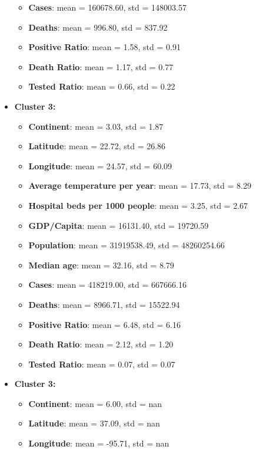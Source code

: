 \documentclass[12pt,a4paper]{article}
\begin{document}
\begin{itemize}
\begin{itemize}
            \item \textbf{Cases}: mean = 160678.60, std = 148003.57
            \item \textbf{Deaths}: mean = 996.80, std = 837.92
            \item \textbf{Positive Ratio}: mean = 1.58, std = 0.91
            \item \textbf{Death Ratio}: mean = 1.17, std = 0.77
            \item \textbf{Tested Ratio}: mean = 0.66, std = 0.22
        \end{itemize}
    \item \textbf{Cluster 3:} 
        \begin{itemize}
            \item \textbf{Continent}: mean = 3.03, std = 1.87
            \item \textbf{Latitude}: mean = 22.72, std = 26.86
            \item \textbf{Longitude}: mean = 24.57, std = 60.09
            \item \textbf{Average temperature per year}: mean = 17.73, std = 8.29
            \item \textbf{Hospital beds per 1000 people}: mean = 3.25, std = 2.67
            \item \textbf{GDP/Capita}: mean = 16131.40, std = 19720.59
            \item \textbf{Population}: mean = 31919538.49, std = 48260254.66
            \item \textbf{Median age}: mean = 32.16, std = 8.79
            \item \textbf{Cases}: mean = 418219.00, std = 667666.16
            \item \textbf{Deaths}: mean = 8966.71, std = 15522.94
            \item \textbf{Positive Ratio}: mean = 6.48, std = 6.16
            \item \textbf{Death Ratio}: mean = 2.12, std = 1.20
            \item \textbf{Tested Ratio}: mean = 0.07, std = 0.07
        \end{itemize}
    \item \textbf{Cluster 3:} 
        \begin{itemize}
            \item \textbf{Continent}: mean = 6.00, std = nan
            \item \textbf{Latitude}: mean = 37.09, std = nan
            \item \textbf{Longitude}: mean = -95.71, std = nan

\end{itemize}
\end{itemize}
\end{document}
